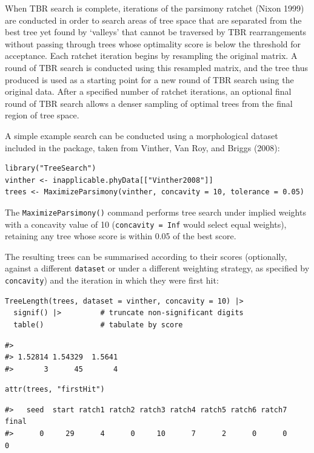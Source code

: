 When TBR search is complete, iterations of the parsimony ratchet (Nixon 1999)
are conducted in order to search areas of tree space that are separated from the
best tree yet found by `valleys' that cannot be traversed by TBR rearrangements
without passing through trees whose optimality score is below the threshold for
acceptance. Each ratchet iteration begins by resampling the original matrix. A
round of TBR search is conducted using this resampled matrix, and the tree thus
produced is used as a starting point for a new round of TBR search using the
original data. After a specified number of ratchet iterations, an optional final
round of TBR search allows a denser sampling of optimal trees from the final
region of tree space.

A simple example search can be conducted using a morphological dataset included
in the package, taken from Vinther, Van Roy, and Briggs (2008):

\begin{verbatim}
library("TreeSearch")
vinther <- inapplicable.phyData[["Vinther2008"]]
trees <- MaximizeParsimony(vinther, concavity = 10, tolerance = 0.05)
\end{verbatim}

The \texttt{MaximizeParsimony()} command performs tree search under implied weights
with a concavity value of 10 (\texttt{concavity\ =\ Inf} would select equal weights),
retaining any tree whose score is within 0.05 of the best score.

The resulting trees can be summarised according to their scores (optionally,
against a different \texttt{dataset} or under a different weighting strategy, as
specified by \texttt{concavity}) and the iteration in which they were first hit:

\begin{verbatim}
TreeLength(trees, dataset = vinther, concavity = 10) |> 
  signif() |>         # truncate non-significant digits
  table()             # tabulate by score
\end{verbatim}

\begin{verbatim}
#> 
#> 1.52814 1.54329  1.5641 
#>       3      45       4
\end{verbatim}

\begin{verbatim}
attr(trees, "firstHit")
\end{verbatim}

\begin{verbatim}
#>   seed  start ratch1 ratch2 ratch3 ratch4 ratch5 ratch6 ratch7  final 
#>      0     29      4      0     10      7      2      0      0      0
\end{verbatim}

